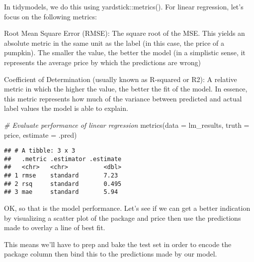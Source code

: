 \documentclass[
]{article}
\newenvironment{Shaded}{\begin{snugshade}}{\end{snugshade}}
\newcommand{\AttributeTok}[1]{\textcolor[rgb]{0.77,0.63,0.00}{#1}}
\newcommand{\CommentTok}[1]{\textcolor[rgb]{0.56,0.35,0.01}{\textit{#1}}}
\newcommand{\FunctionTok}[1]{\textcolor[rgb]{0.00,0.00,0.00}{#1}}
\newcommand{\NormalTok}[1]{#1}
\begin{document}
In tidymodels, we do this using yardstick::metrics(). For linear
regression, let's focus on the following metrics:

Root Mean Square Error (RMSE): The square root of the MSE. This yields
an absolute metric in the same unit as the label (in this case, the
price of a pumpkin). The smaller the value, the better the model (in a
simplistic sense, it represents the average price by which the
predictions are wrong)

Coefficient of Determination (usually known as R-squared or R2): A
relative metric in which the higher the value, the better the fit of the
model. In essence, this metric represents how much of the variance
between predicted and actual label values the model is able to explain.

\begin{Shaded}
\begin{Highlighting}[]
\CommentTok{\# Evaluate performance of linear regression}
\FunctionTok{metrics}\NormalTok{(}\AttributeTok{data =}\NormalTok{ lm\_results,}
        \AttributeTok{truth =}\NormalTok{ price,}
        \AttributeTok{estimate =}\NormalTok{ .pred)}
\end{Highlighting}
\end{Shaded}

\begin{verbatim}
## # A tibble: 3 x 3
##   .metric .estimator .estimate
##   <chr>   <chr>          <dbl>
## 1 rmse    standard       7.23 
## 2 rsq     standard       0.495
## 3 mae     standard       5.94
\end{verbatim}

OK, so that is the model performance. Let's see if we can get a better
indication by visualizing a scatter plot of the package and price then
use the predictions made to overlay a line of best fit.

This means we'll have to prep and bake the test set in order to encode
the package column then bind this to the predictions made by our model.
\end{document}

